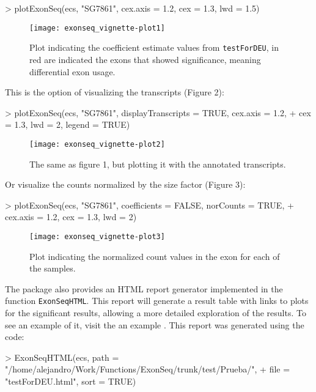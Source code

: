 \documentclass{article}
\begin{document}
\begin{Schunk}
\begin{Sinput}
> plotExonSeq(ecs, "SG7861", cex.axis = 1.2, cex = 1.3, lwd = 1.5)
\end{Sinput}
\end{Schunk}
\begin{figure}
\centering
\texttt{[image: exonseq\_vignette-plot1]}
\caption{Plot indicating the coefficient estimate values from \texttt{testForDEU}, in red are indicated the exons that showed significance, meaning differential exon usage.}
\label{plot1}
\end{figure}
\normalsize
This is the option of visualizing the transcripts (Figure 2): \\

\begin{Schunk}
\begin{Sinput}
> plotExonSeq(ecs, "SG7861", displayTranscripts = TRUE, cex.axis = 1.2, 
+     cex = 1.3, lwd = 2, legend = TRUE)
\end{Sinput}
\end{Schunk}
\begin{figure}
\centering
\texttt{[image: exonseq\_vignette-plot2]}
\caption{The same as figure 1, but plotting it with the annotated transcripts.}
\label{plot2}
\end{figure}
\normalsize
Or visualize the counts normalized by the size factor (Figure 3): \\

\begin{Schunk}
\begin{Sinput}
> plotExonSeq(ecs, "SG7861", coefficients = FALSE, norCounts = TRUE, 
+     cex.axis = 1.2, cex = 1.3, lwd = 2)
\end{Sinput}
\end{Schunk}
\begin{figure}
\centering
\texttt{[image: exonseq\_vignette-plot3]}
\caption{Plot indicating the normalized count values in the exon for each of the samples.}
\label{plot3}
\end{figure}
The package also provides an HTML report generator implemented in the function \texttt{ExonSeqHTML}.  This report will generate a result table with links to plots for the significant results, allowing a more detailed exploration of the results. To see an example of it, visit the an example . This report was generated using the code:
\begin{Schunk}
\begin{Sinput}
> ExonSeqHTML(ecs, path = "/home/alejandro/Work/Functions/ExonSeq/trunk/test/Prueba/", 
+     file = "testForDEU.html", sort = TRUE)
\end{Sinput}
\end{Schunk}
\end{document}
